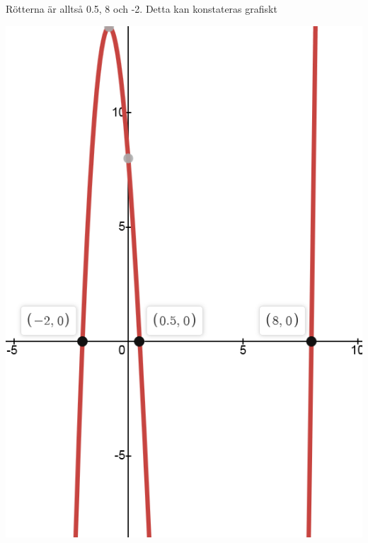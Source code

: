 \documentclass[a4paper,12pt]{article}
\begin{document}
\begin{enumerate}
          Rötterna är alltså 0.5, 8 och -2. 
          Detta kan konstateras grafiskt

          \begin{center}
                \includegraphics[scale=0.4]{Figur 4.png}
          \end{center}

\end{enumerate}
\end{document}
